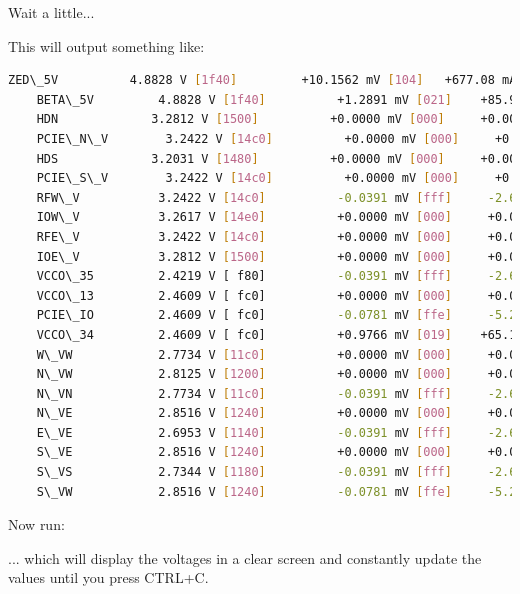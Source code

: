 

Wait a little...\\


This will output something like: 

\begin{lstlisting}[language=bash,morekeywords=$,keywordstyle=\bfseries,frame=none,xleftmargin=.25in,belowskip=2em, aboveskip=2em]
    ZED\_5V          4.8828 V [1f40]         +10.1562 mV [104]   +677.08 mA
    BETA\_5V         4.8828 V [1f40]          +1.2891 mV [021]    +85.94 mA
    HDN             3.2812 V [1500]          +0.0000 mV [000]     +0.00 mA
    PCIE\_N\_V        3.2422 V [14c0]          +0.0000 mV [000]     +0.00 mA
    HDS             3.2031 V [1480]          +0.0000 mV [000]     +0.00 mA
    PCIE\_S\_V        3.2422 V [14c0]          +0.0000 mV [000]     +0.00 mA
    RFW\_V           3.2422 V [14c0]          -0.0391 mV [fff]     -2.60 mA
    IOW\_V           3.2617 V [14e0]          +0.0000 mV [000]     +0.00 mA
    RFE\_V           3.2422 V [14c0]          +0.0000 mV [000]     +0.00 mA
    IOE\_V           3.2812 V [1500]          +0.0000 mV [000]     +0.00 mA
    VCCO\_35         2.4219 V [ f80]          -0.0391 mV [fff]     -2.60 mA
    VCCO\_13         2.4609 V [ fc0]          +0.0000 mV [000]     +0.00 mA
    PCIE\_IO         2.4609 V [ fc0]          -0.0781 mV [ffe]     -5.21 mA
    VCCO\_34         2.4609 V [ fc0]          +0.9766 mV [019]    +65.10 mA
    W\_VW            2.7734 V [11c0]          +0.0000 mV [000]     +0.00 mA
    N\_VW            2.8125 V [1200]          +0.0000 mV [000]     +0.00 mA
    N\_VN            2.7734 V [11c0]          -0.0391 mV [fff]     -2.60 mA
    N\_VE            2.8516 V [1240]          +0.0000 mV [000]     +0.00 mA
    E\_VE            2.6953 V [1140]          -0.0391 mV [fff]     -2.60 mA
    S\_VE            2.8516 V [1240]          +0.0000 mV [000]     +0.00 mA
    S\_VS            2.7344 V [1180]          -0.0391 mV [fff]     -2.60 mA
    S\_VW            2.8516 V [1240]          -0.0781 mV [ffe]     -5.21 mA
\end{lstlisting}

Now run: \\


... which will display the voltages in a clear screen and constantly update the values until you press CTRL+C.\\

